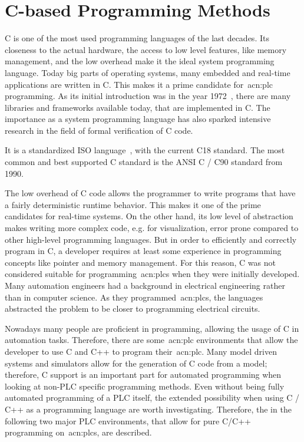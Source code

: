 \section{C-based Programming Methods}
\label{sec:c_methods}

C is one of the most used programming languages of the last decades.
Its closeness to the actual hardware, the access to low level features, like memory management, and the low overhead make it the ideal system programming language.
Today big parts of operating systems, many embedded and real-time applications are written in C.
This makes it a prime candidate for~\acrshort{acn:plc} programming.
As its initial introduction was in the year 1972~\cite{10.5555/576122}, there are many libraries and frameworks available today, that are implemented in C.
The importance as a system programming language has also sparked intensive research in the field of formal verification of C code.

It is a standardized ISO language~\cite{ISO:9899:2018}, with the current C18 standard.
The most common and best supported C standard is the ANSI C / C90 standard from 1990.

The low overhead of C code allows the programmer to write programs that have a fairly deterministic runtime behavior.
This makes it one of the prime candidates for real-time systems.
On the other hand, its low level of abstraction makes writing more complex code, e.g. for visualization, error prone compared to other high-level programming languages.
But in order to efficiently and correctly program in C, a developer requires at least some experience in programming concepts like pointer and memory management.
For this reason, C was not considered suitable for programming~\acrshort{acn:plc}s when they were initially developed.
Many automation engineers had a background in electrical engineering rather than in computer science.
As they programmed~\acrshort{acn:plc}s, the languages abstracted the problem to be closer to programming electrical circuits.

Nowadays many people are proficient in programming, allowing the usage of C in automation tasks.
Therefore, there are some~\acrshort{acn:plc} environments that allow the developer to use C and C++ to program their~\acrshort{acn:plc}.
Many model driven systems and simulators allow for the generation of C code from a model; therefore, C support is an important part for automated programming when looking at non-PLC specific programming methods.
Even without being fully automated programming of a PLC itself, the extended possibility when using C / C++ as a programming language are worth investigating.
Therefore, the in the following two major PLC environments, that allow for pure C/C++ programming on~\acrshort{acn:plc}s, are described.

